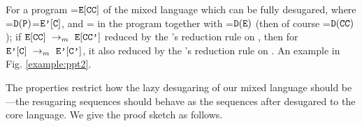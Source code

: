 \begin{property} \label{thm2}
	For a program =$\mbox{\tt E}[\mbox{\tt CC}]$ of the mixed language which can be fully desugared, where =$\mathtt{D}(\mbox{\tt P})$=$\mbox{\tt E'}[\mbox{\tt C}]$, and = in the program  together with =$\mathtt{D}(\mbox{\tt E})$ (then of course =$\mathtt{D}(\mbox{\tt CC})$); if $\mbox{\tt E}[\mbox{\tt CC}] ~\rightarrow_m~\mbox{\tt E}[\mbox{\tt CC'}]$ reduced by the 's reduction rule on , then for $\mbox{\tt E'}[\mbox{\tt C}] ~\rightarrow_m~\mbox{\tt E'}[\mbox{\tt C'}]$, it also reduced by the 's reduction rule on . An example in Fig. \ref{example:ppt2}.
\end{property}


The properties restrict how the lazy desugaring of our mixed language should be---the resugaring sequences should behave as the sequences after desugared to the core language. We give the proof sketch as follows.

